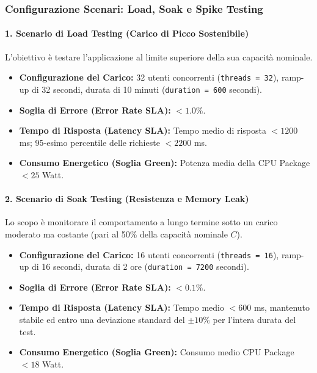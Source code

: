 \subsubsection{Configurazione Scenari: Load, Soak e Spike Testing}

\paragraph{1. Scenario di Load Testing (Carico di Picco Sostenibile)}
L'obiettivo è testare l'applicazione al limite superiore della sua capacità nominale.
\begin{itemize}
    \item \textbf{Configurazione del Carico:} 32 utenti concorrenti (\texttt{threads = 32}), ramp-up di 32 secondi, durata di 10 minuti (\texttt{duration = 600} secondi).
    \item \textbf{Soglia di Errore (Error Rate SLA):} $< 1.0\%$.
    \item \textbf{Tempo di Risposta (Latency SLA):} Tempo medio di risposta $< 1200$ ms; 95-esimo percentile delle richieste $< 2200$ ms.
    \item \textbf{Consumo Energetico (Soglia Green):} Potenza media della CPU Package $< 25$ Watt.
\end{itemize}

\paragraph{2. Scenario di Soak Testing (Resistenza e Memory Leak)}
Lo scopo è monitorare il comportamento a lungo termine sotto un carico moderato ma costante (pari al 50\% della capacità nominale $C$).
\begin{itemize}
    \item \textbf{Configurazione del Carico:} 16 utenti concorrenti (\texttt{threads = 16}), ramp-up di 16 secondi, durata di 2 ore (\texttt{duration = 7200} secondi).
    \item \textbf{Soglia di Errore (Error Rate SLA):} $< 0.1\%$.
    \item \textbf{Tempo di Risposta (Latency SLA):} Tempo medio $< 600$ ms, mantenuto stabile ed entro una deviazione standard del $\pm 10\%$ per l'intera durata del test.
    \item \textbf{Consumo Energetico (Soglia Green):} Consumo medio CPU Package $< 18$ Watt.
\end{itemize}


